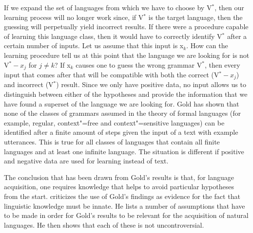 If we expand the set of languages from which we have to choose by V$^*$, then our learning process will no longer work since, if
V$^*$ is the target language, then the guessing will perpetually yield incorrect results.
If there were a procedure capable of learning this language class, then it would have to correctly identify V$^*$ after a certain
number of inputs. Let us assume that this input is x$_k$. How can the learning procedure tell us at this point that the language
we are looking for is not V$^* - x_j$ for $j \neq k$? If x$_k$ causes one to guess the wrong grammar
V$^*$, then every input that comes after that will be compatible
with both the correct (V$^* - x_j$) and incorrect (V$^*$) result. Since we only have positive
data, no input allows us to distinguish between either of the
hypotheses and provide the information that we have found a superset of the language we are looking for.
Gold has shown that none of the classes of grammars assumed in the theory of formal languages (for example, regular, context"=free and context"=sensitive languages) can be identified after a finite amount of steps given the input of a text with example utterances.
This is true for all classes of languages that contain all finite languages and at least one infinite language. The situation is different if positive and negative data
are used for learning instead of text.

The conclusion that has been drawn from Gold's results is that, for language acquisition, one requires knowledge that helps to avoid particular hypotheses from the start.
 criticizes the use of Gold's findings as evidence for the fact that linguistic knowledge must be innate. He lists a number of assumptions that have
to be made in order for Gold's results to be relevant for the acquisition of natural languages. He then shows that each of these is not uncontroversial.

